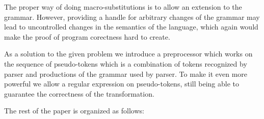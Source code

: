 The proper way of doing macro-substitutions is to allow an
extension to the grammar.  However, providing a handle for
arbitrary changes of the grammar may lead to uncontrolled 
changes in the semantics of the language, which again would
make the proof of program corectness hard to create.

As a solution to the given problem we introduce a preprocessor
which works on the sequence of pseudo-tokens which is a combination
of tokens recognized by parser and productions of the grammar
used by parser.  To make it even more powerful we allow a 
regular expression on pseudo-tokens, still being able to 
guarantee the correctness of the transformation.

The rest of the paper is organized as follows:



